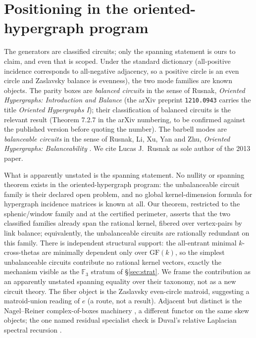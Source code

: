 \documentclass[11pt,reqno]{amsart}
\theoremstyle{plain}
\theoremstyle{definition}
\theoremstyle{plain}
\theoremstyle{definition}
\newcommand{\F}{\mathbb{F}}
\begin{document}
\section{Positioning in the oriented-hypergraph program}\label{sec:pos}

The generators are classified circuits; only the spanning statement is ours to claim, and even
that is scoped. Under the standard dictionary (all-positive incidence corresponds to
all-negative adjacency, so a positive circle is an even circle and Zaslavsky balance is
evenness), the two mode families are known objects. The parity boxes are \emph{balanced
circuits} in the sense of Rusnak, \emph{Oriented Hypergraphs: Introduction and Balance}
\cite{Rusnak2013} (the arXiv preprint \texttt{1210.0943} carries the title \emph{Oriented
Hypergraphs I}); their classification of balanced circuits is the relevant result (Theorem 7.2.7
in the arXiv numbering, to be confirmed against the published version before quoting the number).
The barbell modes are \emph{balanceable circuits} in the sense of Rusnak, Li, Xu, Yan and Zhu,
\emph{Oriented Hypergraphs: Balanceability} \cite{RLXYZ2022}. We cite Lucas J.\ Rusnak as sole
author of the 2013 paper.

What is apparently unstated is the spanning statement. No nullity or spanning theorem exists in
the oriented-hypergraph program: the unbalanceable circuit family is their declared open problem,
and no global kernel-dimension formula for hypergraph incidence matrices is known at all. Our
theorem, restricted to the sphenic/window family and at the certified perimeter, asserts that the
two classified families already span the rational kernel, fibered over vertex-pairs by link
balance; equivalently, the unbalanceable circuits are rationally redundant on this family. There
is independent structural support: the all-entrant minimal $k$-cross-thetas are minimally
dependent only over $\mathrm{GF}(k)$, so the simplest unbalanceable circuits contribute no
rational kernel vectors, exactly the mechanism visible as the $\F_3$ stratum of \S\ref{sec:strat}.
We frame the contribution as an apparently unstated spanning equality over their taxonomy, not as
a new circuit theory. The fiber object is the Zaslavsky even-circle matroid, suggesting a
matroid-union reading of $e$ (a route, not a result). Adjacent but distinct is the Nagel--Reiner
complex-of-boxes machinery \cite{NagelReiner}, a different functor on the same skew objects; the
one named residual specialist check is Duval's relative Laplacian spectral recursion
\cite{DuvalLap}.
\end{document}
